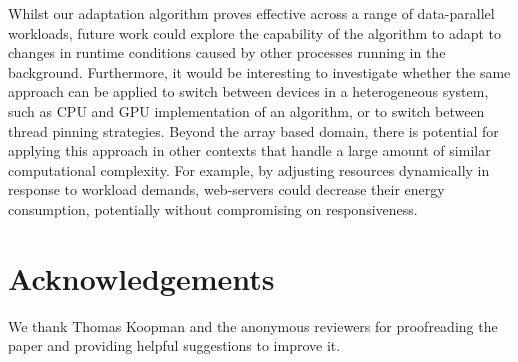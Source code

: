 \documentclass[runningheads]{llncs}
\begin{document}
Whilst our adaptation algorithm proves effective across a range of data-parallel workloads, future work could explore the capability of the algorithm to adapt to changes in runtime conditions caused by other processes running in the background.
Furthermore, it would be interesting to investigate whether the same approach can be applied to switch between devices in a heterogeneous system, such as CPU and GPU implementation of an algorithm, or to switch between thread pinning strategies.
Beyond the array based domain, there is potential for applying this approach in other contexts that handle a large amount of similar computational complexity.
For example, by adjusting resources dynamically in response to workload demands, web-servers could decrease their energy consumption, potentially without compromising on responsiveness.

\section*{Acknowledgements}
We thank Thomas Koopman and the anonymous reviewers for proofreading the paper and providing helpful suggestions to improve it.



\end{document}
